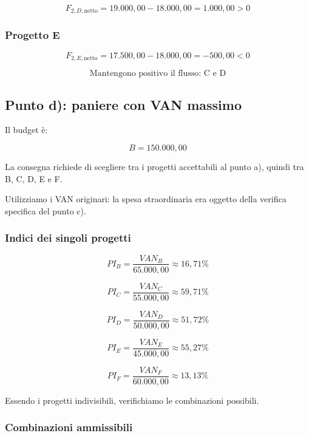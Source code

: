 \[
    F_{2,D,\text{netto}}
    =
    19.000{,}00-18.000{,}00
    =
    1.000{,}00>0
\]

\subsubsection*{Progetto E}

\[
    F_{2,E,\text{netto}}
    =
    17.500{,}00-18.000{,}00
    =
    -500{,}00<0
\]

\[
    \boxed{\text{Mantengono positivo il flusso: C e D}}
\]

\subsection{Punto d): paniere con VAN massimo}

Il budget è:

\[
    B=150.000{,}00
\]

\noindent La consegna richiede di scegliere tra i progetti
accettabili al punto a), quindi tra B, C, D, E e F.

\noindent Utilizziamo i VAN originari: la spesa straordinaria
era oggetto della verifica specifica del punto c).

\subsubsection*{Indici dei singoli progetti}

\[
    PI_B
    =
    \frac{VAN_B}{65.000{,}00}
    \approx16{,}71\%
\]

\[
    PI_C
    =
    \frac{VAN_C}{55.000{,}00}
    \approx59{,}71\%
\]

\[
    PI_D
    =
    \frac{VAN_D}{50.000{,}00}
    \approx51{,}72\%
\]

\[
    PI_E
    =
    \frac{VAN_E}{45.000{,}00}
    \approx55{,}27\%
\]

\[
    PI_F
    =
    \frac{VAN_F}{60.000{,}00}
    \approx13{,}13\%
\]

\noindent Essendo i progetti indivisibili, verifichiamo
le combinazioni possibili.

\subsubsection*{Combinazioni ammissibili}

